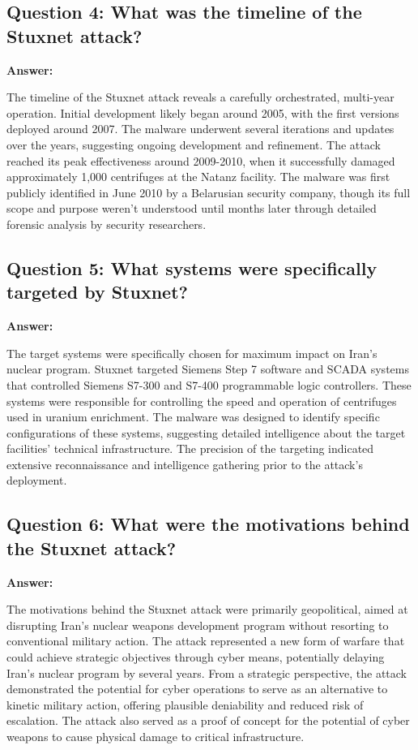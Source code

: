 \documentclass[12pt,a4paper]{article}
\begin{document}
\subsection{Question 4: What was the timeline of the Stuxnet attack?}

\textbf{Answer:}

The timeline of the Stuxnet attack reveals a carefully orchestrated, multi-year operation. Initial development likely began around 2005, with the first versions deployed around 2007. The malware underwent several iterations and updates over the years, suggesting ongoing development and refinement. The attack reached its peak effectiveness around 2009-2010, when it successfully damaged approximately 1,000 centrifuges at the Natanz facility. The malware was first publicly identified in June 2010 by a Belarusian security company, though its full scope and purpose weren't understood until months later through detailed forensic analysis by security researchers.

\subsection{Question 5: What systems were specifically targeted by Stuxnet?}

\textbf{Answer:}

The target systems were specifically chosen for maximum impact on Iran's nuclear program. Stuxnet targeted Siemens Step 7 software and SCADA systems that controlled Siemens S7-300 and S7-400 programmable logic controllers. These systems were responsible for controlling the speed and operation of centrifuges used in uranium enrichment. The malware was designed to identify specific configurations of these systems, suggesting detailed intelligence about the target facilities' technical infrastructure. The precision of the targeting indicated extensive reconnaissance and intelligence gathering prior to the attack's deployment.

\subsection{Question 6: What were the motivations behind the Stuxnet attack?}

\textbf{Answer:}

The motivations behind the Stuxnet attack were primarily geopolitical, aimed at disrupting Iran's nuclear weapons development program without resorting to conventional military action. The attack represented a new form of warfare that could achieve strategic objectives through cyber means, potentially delaying Iran's nuclear program by several years. From a strategic perspective, the attack demonstrated the potential for cyber operations to serve as an alternative to kinetic military action, offering plausible deniability and reduced risk of escalation. The attack also served as a proof of concept for the potential of cyber weapons to cause physical damage to critical infrastructure.
\end{document}
